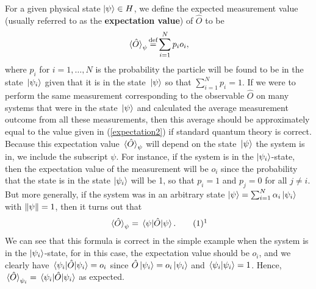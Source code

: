 For a given physical state $\ket{\psi}\in H$, we define the expected measurement value (usually referred to as the \textbf{expectation value}) of $\hat{O}$ to be 
\begin{equation}\label{expectation2}
\ev*{\hat{O}}_\psi\myeq\sum_{i=1}^N p_io_i,
\end{equation}
where %
%
$p_i$  %
%
for $i=1,\ldots, N$ is the probability the particle will be found to be in the state $\ket*{\psi_i}$ given that it is in the state $\ket*{\psi}$ so that  $\sum_{i=1}^N p_i=1$. If we were to perform the same measurement corresponding to the observable $\hat{O}$ on many systems that were in the state $\ket*{\psi}$ and calculated the average measurement outcome from all these measurements, then this average should be approximately equal to the value given in (\ref{expectation2}) if  standard quantum theory is correct. Because this expectation value $\ev*{\hat{O}}_\psi$ will depend on the state $\ket*{\psi}$ the system is in, we include the subscript $\psi$. For instance, if the system is in the $\ket{\psi_i}$-state, then the expectation value of the measurement will be $o_i$ since the probability that the state is in the state $\ket{\psi_i}$ will be 1, so that $p_i=1$ and $p_j=0$ for all $j\neq i$. But more generally, if the system was in an arbitrary state $\ket{\psi}=\sum_{i=1}^N \alpha_i\ket{\psi_i}$ with $\norm{\psi}=1$, then it turns out that 
\begin{equation}\refstepcounter{equation}\label{evev}\ev*{\hat{O}}_\psi=\ev*{\hat{O}}{\psi}.\tag{\theequation}\protect\footnotemark
\end{equation}We can see that this formula is correct in the simple example when the system is in the $\ket{\psi_i}$-state, for in this case, the expectation value should be $o_i$, and we clearly have $\ev*{\hat{O}}{\psi_i}=o_i$ since $\hat{O}\ket{\psi_i}=o_i\ket{\psi_i}$ and $\ip*{\psi_i}=1$. Hence, $\ev*{\hat{O}}_{\psi_i}=\ev*{\hat{O}}{\psi_i}$ as expected.

